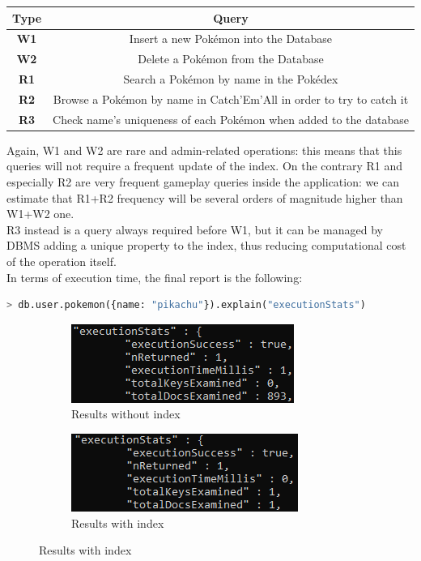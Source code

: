 \begin{center}
	\begin{tabular}{|c | c |} 
		\hline
		\textbf{Type} & \textbf{Query} \\ [0.5ex] 
		\hline
		\textbf{W1} & Insert a new Pokémon into the Database \\ 
		\hline
		\textbf{W2} & Delete a Pokémon from the Database \\
		\hline
		\textbf{R1} & Search a Pokémon by name in the Pokédex \\
		\hline
		\textbf{R2} & Browse a Pokémon by name in Catch’Em’All in order to try to catch it \\
		\hline
		\textbf{R3} & Check name’s uniqueness of each Pokémon when added to the database \\
		\hline
	\end{tabular}
\end{center}

Again, W1 and W2 are rare and admin-related operations: this means that this queries will not require a frequent update of the index. On the contrary R1 and especially R2 are very frequent gameplay queries inside the application: we can estimate that R1+R2 frequency will be several orders of magnitude higher than W1+W2 one. \\
R3 instead is a query always required before W1, but it can be managed by DBMS adding a unique property to the index, thus reducing computational cost of the operation itself. \\
In terms of execution time, the final report is the following:  

\begin{lstlisting}[language=python]
	> db.user.pokemon({name: "pikachu"}).explain("executionStats")
\end{lstlisting}
\begin{figure}[H]
	\begin{subfigure}{0.48\textwidth}
		\includegraphics[width=0.9\linewidth]{img/PokemonNameNoIndex.png} 
		\caption{Results without index}
	\end{subfigure}
	\begin{subfigure}{0.48\textwidth}
		\includegraphics[width=0.9\linewidth]{img/PokemonNameIndex.png}
		\caption{Results with index}
	\end{subfigure}
\end{figure}


